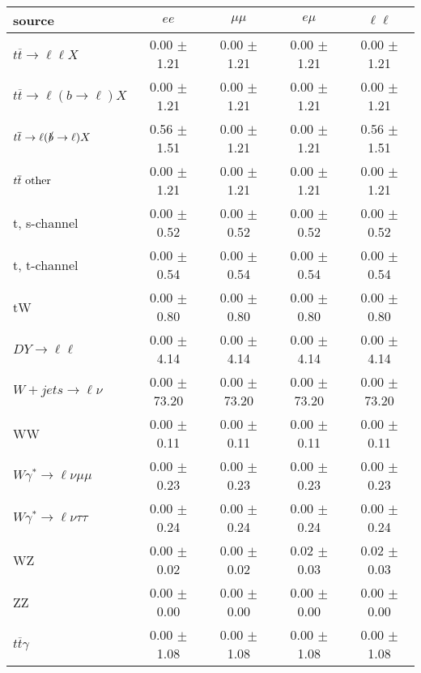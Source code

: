 \begin{tabular}{l|cccc} \hline\hline
source & $ee$ & $\mu\mu$ & $e\mu$ & $\ell\ell $ \\
\hline
$t\overline{t} \rightarrow \ell \ell X$ &  0.00 $\pm$  1.21 &  0.00 $\pm$  1.21 &  0.00 $\pm$  1.21 &  0.00 $\pm$  1.21 \\
$t\overline{t} \rightarrow \ell (b \rightarrow \ell) X$ &  0.00 $\pm$  1.21 &  0.00 $\pm$  1.21 &  0.00 $\pm$  1.21 &  0.00 $\pm$  1.21 \\
$t\overline{t} \rightarrow \ell (\slashed b \rightarrow \ell) X$ &  0.56 $\pm$  1.51 &  0.00 $\pm$  1.21 &  0.00 $\pm$  1.21 &  0.56 $\pm$  1.51 \\
        $t\overline{t}\ \rm{other}$ &  0.00 $\pm$  1.21 &  0.00 $\pm$  1.21 &  0.00 $\pm$  1.21 &  0.00 $\pm$  1.21 \\
\hline
                       t, s-channel &  0.00 $\pm$  0.52 &  0.00 $\pm$  0.52 &  0.00 $\pm$  0.52 &  0.00 $\pm$  0.52 \\
                       t, t-channel &  0.00 $\pm$  0.54 &  0.00 $\pm$  0.54 &  0.00 $\pm$  0.54 &  0.00 $\pm$  0.54 \\
                                 tW &  0.00 $\pm$  0.80 &  0.00 $\pm$  0.80 &  0.00 $\pm$  0.80 &  0.00 $\pm$  0.80 \\
\hline
         $DY \rightarrow \ell \ell$ &  0.00 $\pm$  4.14 &  0.00 $\pm$  4.14 &  0.00 $\pm$  4.14 &  0.00 $\pm$  4.14 \\
      $W+jets \rightarrow \ell \nu$ &  0.00 $\pm$ 73.20 &  0.00 $\pm$ 73.20 &  0.00 $\pm$ 73.20 &  0.00 $\pm$ 73.20 \\
                                 WW &  0.00 $\pm$  0.11 &  0.00 $\pm$  0.11 &  0.00 $\pm$  0.11 &  0.00 $\pm$  0.11 \\
\hline
$W\gamma^{*} \rightarrow \ell \nu \mu\mu$ &  0.00 $\pm$  0.23 &  0.00 $\pm$  0.23 &  0.00 $\pm$  0.23 &  0.00 $\pm$  0.23 \\
$W\gamma^{*} \rightarrow \ell \nu \tau\tau$ &  0.00 $\pm$  0.24 &  0.00 $\pm$  0.24 &  0.00 $\pm$  0.24 &  0.00 $\pm$  0.24 \\
                                 WZ &  0.00 $\pm$  0.02 &  0.00 $\pm$  0.02 &  0.02 $\pm$  0.03 &  0.02 $\pm$  0.03 \\
                                 ZZ &  0.00 $\pm$  0.00 &  0.00 $\pm$  0.00 &  0.00 $\pm$  0.00 &  0.00 $\pm$  0.00 \\
\hline
              $t\overline{t}\gamma$ &  0.00 $\pm$  1.08 &  0.00 $\pm$  1.08 &  0.00 $\pm$  1.08 &  0.00 $\pm$  1.08 \\

\end{tabular}
